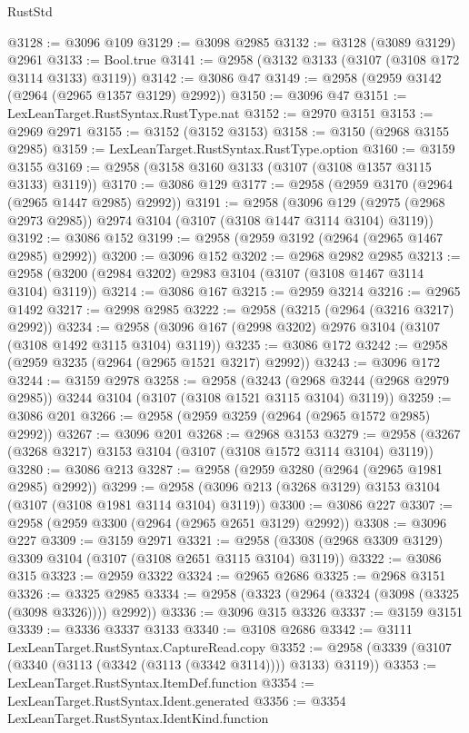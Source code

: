 \begin{lexlean}{RustStd}
\begin{coremodule}
@3128 := @3096 @109
@3129 := @3098 @2985
@3132 := @3128 (@3089 @3129) @2961
@3133 := Bool.true
@3141 := @2958 (@3132 @3133 (@3107 (@3108 @172 @3114 @3133) @3119))
@3142 := @3086 @47
@3149 := @2958 (@2959 @3142 (@2964 (@2965 @1357 @3129) @2992))
@3150 := @3096 @47
@3151 := LexLeanTarget.RustSyntax.RustType.nat
@3152 := @2970 @3151
@3153 := @2969 @2971
@3155 := @3152 (@3152 @3153)
@3158 := @3150 (@2968 @3155 @2985)
@3159 := LexLeanTarget.RustSyntax.RustType.option
@3160 := @3159 @3155
@3169 := @2958 (@3158 @3160 @3133 (@3107 (@3108 @1357 @3115 @3133) @3119))
@3170 := @3086 @129
@3177 := @2958 (@2959 @3170 (@2964 (@2965 @1447 @2985) @2992))
@3191 := @2958
    (@3096 @129 (@2975 (@2968 @2973 @2985)) @2974 @3104 (@3107 (@3108 @1447 @3114 @3104) @3119))
@3192 := @3086 @152
@3199 := @2958 (@2959 @3192 (@2964 (@2965 @1467 @2985) @2992))
@3200 := @3096 @152
@3202 := @2968 @2982 @2985
@3213 := @2958 (@3200 (@2984 @3202) @2983 @3104 (@3107 (@3108 @1467 @3114 @3104) @3119))
@3214 := @3086 @167
@3215 := @2959 @3214
@3216 := @2965 @1492
@3217 := @2998 @2985
@3222 := @2958 (@3215 (@2964 (@3216 @3217) @2992))
@3234 := @2958 (@3096 @167 (@2998 @3202) @2976 @3104 (@3107 (@3108 @1492 @3115 @3104) @3119))
@3235 := @3086 @172
@3242 := @2958 (@2959 @3235 (@2964 (@2965 @1521 @3217) @2992))
@3243 := @3096 @172
@3244 := @3159 @2978
@3258 := @2958
    (@3243 (@2968 @3244 (@2968 @2979 @2985)) @3244 @3104 (@3107 (@3108 @1521 @3115 @3104) @3119))
@3259 := @3086 @201
@3266 := @2958 (@2959 @3259 (@2964 (@2965 @1572 @2985) @2992))
@3267 := @3096 @201
@3268 := @2968 @3153
@3279 := @2958 (@3267 (@3268 @3217) @3153 @3104 (@3107 (@3108 @1572 @3114 @3104) @3119))
@3280 := @3086 @213
@3287 := @2958 (@2959 @3280 (@2964 (@2965 @1981 @2985) @2992))
@3299 := @2958 (@3096 @213 (@3268 @3129) @3153 @3104 (@3107 (@3108 @1981 @3114 @3104) @3119))
@3300 := @3086 @227
@3307 := @2958 (@2959 @3300 (@2964 (@2965 @2651 @3129) @2992))
@3308 := @3096 @227
@3309 := @3159 @2971
@3321 := @2958 (@3308 (@2968 @3309 @3129) @3309 @3104 (@3107 (@3108 @2651 @3115 @3104) @3119))
@3322 := @3086 @315
@3323 := @2959 @3322
@3324 := @2965 @2686
@3325 := @2968 @3151
@3326 := @3325 @2985
@3334 := @2958 (@3323 (@2964 (@3324 (@3098 (@3325 (@3098 @3326)))) @2992))
@3336 := @3096 @315 @3326
@3337 := @3159 @3151
@3339 := @3336 @3337 @3133
@3340 := @3108 @2686
@3342 := @3111 LexLeanTarget.RustSyntax.CaptureRead.copy
@3352 := @2958 (@3339 (@3107 (@3340 (@3113 (@3342 (@3113 (@3342 @3114)))) @3133) @3119))
@3353 := LexLeanTarget.RustSyntax.ItemDef.function
@3354 := LexLeanTarget.RustSyntax.Ident.generated
@3356 := @3354 LexLeanTarget.RustSyntax.IdentKind.function

\end{coremodule}
\end{lexlean}
